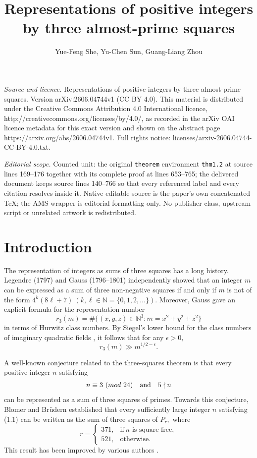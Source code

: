 \documentclass[10pt,a4paper]{amsart}
\numberwithin{equation}{section}
\def\N{{\mathbb N}}
\def\pmod #1{\ ({\rm{mod}}\ #1)}
\begin{document}
\title[Representations of positive integers by three almost-prime s]{Representations of positive integers by three almost-prime squares}
\author{Yue-Feng She, Yu-Chen Sun, Guang-Liang Zhou}
\date{}
\maketitle
\noindent\emph{Source and licence.} Representations of positive integers by three almost-prime squares. Version arXiv:2606.04744v1 (CC BY 4.0). This material is distributed under the Creative Commons Attribution 4.0 International licence, http://creativecommons.org/licenses/by/4.0/, as recorded in the arXiv OAI licence metadata for this exact version and shown on the abstract page https://arxiv.org/abs/2606.04744v1. Full rights notice: licenses/arxiv-2606.04744-CC-BY-4.0.txt.\par\smallskip
\noindent\textit{Editorial scope.} Counted unit: the original \texttt{theorem} environment \texttt{thm1.2} at source lines 169--176 together with its complete proof at lines 653--765; the delivered document keeps source lines 140--766 so that every referenced label and every citation resolves inside it. Native editable source is the paper's own concatenated TeX; the AMS wrapper is editorial formatting only. No publisher class, upstream script or unrelated artwork is redistributed.
\section{Introduction}
\setcounter{lemma}{0}
\setcounter{theorem}{0}
\setcounter{corollary}{0}
\setcounter{remark}{0}
\setcounter{equation}{0}

 The representation of integers as sums of three squares has a long history. Legendre (1797) and Gauss (1796--1801) independently showed that an integer $m$ can be expressed as a sum of three non-negative squares if and only if $m$ is not of the form $4^k(8\ell+7)\ (k,\ell\in\mathbb{N}=\{0,1,2,\dots\})$. Moreover, Gauss gave an explicit formula for the representation number 
 \[
 r_3(m)=\#\{(x,y,z) \in \N^3: m=x^2+y^2+z^2\}
 \]
in terms of Hurwitz class numbers. 
By Siegel's lower bound for the class numbers of imaginary quadratic fields \cite{Si}, it follows that for any $\epsilon > 0,$
$$r_3(m)\gg m^{1/2 - \epsilon}.$$

A well-known conjecture related to the three-squares theorem is that every positive integer $n$ satisfying
\begin{align}\label{e35}
n \equiv 3 \pmod{24} \quad \text{and} \quad 5 \nmid n
\end{align}
can be represented as a sum of three squares of primes. Towards this conjecture, Blomer and Br\"udern \cite{BB} established that every sufficiently large integer $n$ satisfying (1.1) can be written as the sum of three squares of $P_r,$ where
\[
r = \begin{cases}
371, &\text{if}\ n \text{ is square-free}, \\
521, & \text{otherwise}.
\end{cases}
\]
This result has been improved by various authors \cite{Blo, Lv, Cai, Wa}.
\end{document}
